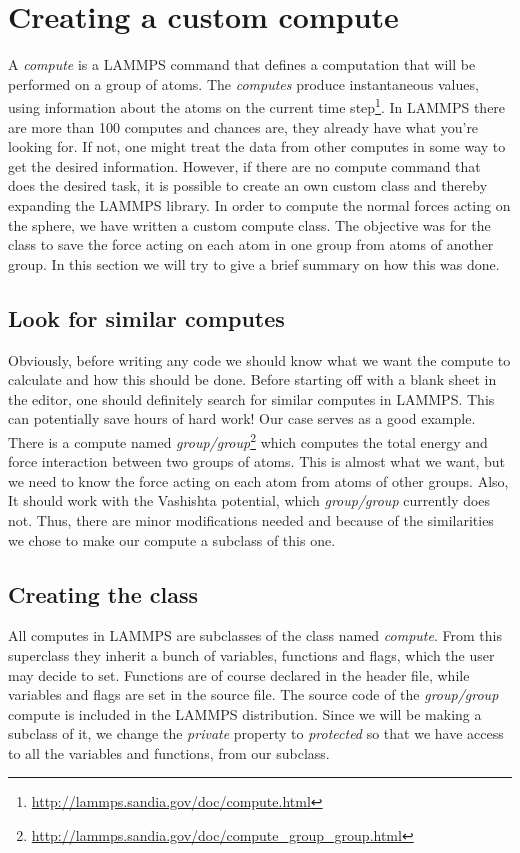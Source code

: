 \documentclass[twoside,english]{uiofysmaster}
\begin{document}
\section{Creating a custom compute} \label{sec:customCompute}
A \textit{compute} is a LAMMPS command that defines a computation that will be performed on a group of atoms. 
The \textit{computes} produce instantaneous values, using information about the atoms on the current time step\footnote{\href{ http://lammps.sandia.gov/doc/compute.html}{ http://lammps.sandia.gov/doc/compute.html}}.
In LAMMPS there are more than 100 computes and chances are, they already have what you're looking for. If not, one might treat the data from other computes in some way to get the desired information. However, if there are no compute command that does the desired task, it is possible to create an own custom class and thereby expanding the LAMMPS library.  
In order to compute the normal forces acting on the sphere, we have written a custom compute class. 
The objective was for the class to save the force acting on each atom in one group from atoms of another group. 
In this section we will try to give a brief summary on how this was done.


\subsection{Look for similar computes}
Obviously, before writing any code we should know what we want the compute to calculate and how this should be done. 
Before starting off with a blank sheet in the editor, one should definitely search for similar computes in LAMMPS. This can potentially save hours of hard work!
Our case serves as a good example.
There is a compute named \textit{group/group}\footnote{\href{http://lammps.sandia.gov/doc/compute_group_group.html}{http://lammps.sandia.gov/doc/compute\_group\_group.html}} which computes the total energy and force interaction between two groups of atoms. 
This is almost what we want, but we need to know the force acting on each atom from atoms of other groups. 
Also, It should work with the Vashishta potential, which \textit{group/group} currently does not.
Thus, there are minor modifications needed and because of the similarities we chose to make our compute a subclass of this one.


\subsection{Creating the class}
All computes in LAMMPS are subclasses of the class named  \textit{compute}. 
From this superclass they inherit a bunch of variables, functions and flags, which the user may decide to set. 
Functions are of course declared in the header file, while variables and flags are set in the source file. 
The source code of the \textit{group/group} compute is included in the LAMMPS distribution. 
Since we will be making a subclass of it, we change the \textit{private} property to \textit{protected} so that we have access to all the variables and functions, from our subclass.
\end{document}
